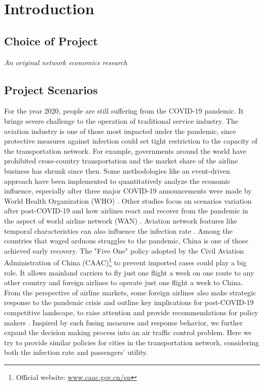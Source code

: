 \section{Introduction}

\subsection{Choice of Project}
\emph{An original network economics research}

\subsection{Project Scenarios}

For the year 2020, people are still suffering from the COVID-19 pandemic. It brings severe challenge to the operation of traditional service industry. The aviation industry is one of those most impacted under the pandemic, since protective measures against infection could set tight restriction to the capacity of the transportation network. For example, governments around the world have prohibited cross-country transportation and the market share of the airline business has shrunk since then. Some methodologies like an event-driven approach have been implemented to quantitatively analyze the economic influence, especially after three major COVID-19 announcements were made by World Health Organization (WHO) \cite{maneenop2020impacts}. Other studies focus on scenarios variation after post-COVID-19 and how airlines react and recover from the pandemic in the aspect of world airline network (WAN) \cite{ye2020scenarios}. Aviation network features like temporal characteristics can also influence the infection rate \cite{scire2017}. Among the countries that waged arduous struggles to the pandemic, China is one of those achieved early recovery. The "Five One" policy adopted by the Civil Aviation Administration of China (CAAC)\footnote{Official website: \url{www.caac.gov.cn/en}} to prevent imported cases could play a big role. It allows mainland carriers to fly just one flight a week on one route to any other country and foreign airlines to operate just one flight a week to China. From the perspective of airline markets, some foreign airlines also make strategic response to the pandemic crisis and outline key implications for post-COVID-19 competitive landscape, to raise attention and provide recommendations for policy makers \cite{albers2020european} \cite{budd2020european}. Inspired by such fusing measures and response behavior, we further expand the decision making process into an air traffic control problem. Here we try to provide similar policies for cities in the transportation network, considering both the infection rate and passengers' utility.


